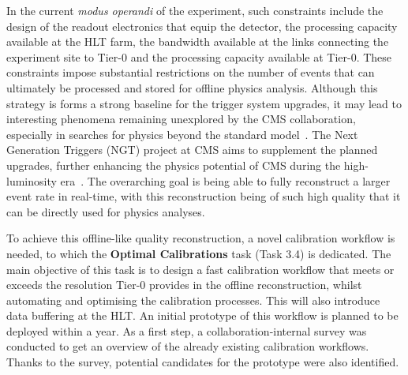 In the current \textit{modus operandi} of the experiment, such constraints include the design of the readout electronics that equip the detector, the processing capacity available at the HLT farm, the bandwidth available at the links connecting the experiment site to Tier-0 and the processing capacity available at Tier-0. These constraints impose substantial restrictions on the number of events that can ultimately be processed and stored for offline physics analysis. Although this strategy is forms a strong baseline for the trigger system upgrades, it may lead to interesting phenomena remaining unexplored by the CMS collaboration, especially in searches for physics beyond the standard model~\cite{cms_exotica_summary_plots}.
The Next Generation Triggers (NGT) project at CMS aims to supplement the planned upgrades, further enhancing the physics potential of CMS during the high-luminosity era~\cite{NGT_proposal}. The overarching goal is being able to fully reconstruct a larger event rate in real-time, with this reconstruction being of such high quality that it can be directly used for physics analyses.

To achieve this offline-like quality reconstruction, a novel calibration workflow is needed, to which the \textbf{Optimal Calibrations} task (Task 3.4) is dedicated. The main objective of this task is to design a fast calibration workflow that meets or exceeds the resolution Tier-0 provides in the offline reconstruction, whilst automating and optimising the calibration processes. This will also introduce data buffering at the HLT. An initial prototype of this workflow is planned to be deployed within a year. As a first step, a collaboration-internal survey was conducted to get an overview of the already existing calibration workflows. Thanks to the survey, potential candidates for the prototype were also identified.

